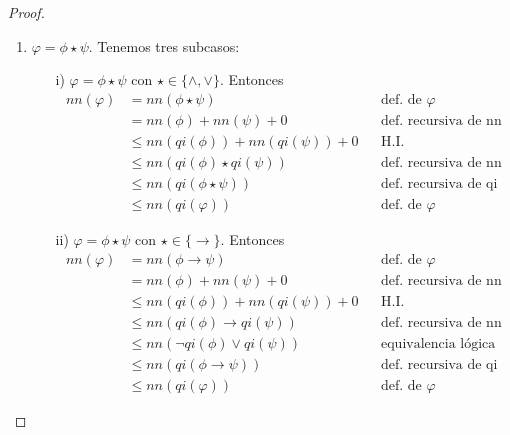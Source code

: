 \documentclass[letterpaper,12pt]{article}
\begin{document}
\begin{enumerate}
\begin{enumerate}
\begin{proof}
\begin{itemize}
\begin{enumerate}
                    \item $\varphi = \phi \star \psi$. Tenemos tres subcasos:
                    \begin{itemize}
                        \item[i)] $\varphi = \phi \star \psi$ con 
                        $\star \in \{\land, \lor \}$. Entonces 
                        \begin{align*}
                            nn(\varphi) 
                            &= nn(\phi \star \psi)
                            && \text{def. de $\varphi$} \\
                            &= nn(\phi) + nn(\psi) + 0
                            && \text{def. recursiva de nn} \\
                            &\leq nn(qi(\phi)) + nn(qi(\psi)) + 0
                            && \text{H.I.} \\
                            &\leq nn(qi(\phi) \star qi(\psi))
                            && \text{def. recursiva de nn} \\
                            &\leq nn(qi(\phi \star \psi))
                            && \text{def. recursiva de qi} \\
                            &\leq nn(qi(\varphi)) 
                            && \text{def. de $\varphi$}
                        \end{align*}

                        \item[ii)] $\varphi = \phi \star \psi$ con 
                        $\star \in \{ \rightarrow\}$. Entonces 
                        \begin{align*}
                            nn(\varphi) 
                            &= nn(\phi \rightarrow \psi)
                            && \text{def. de $\varphi$} \\
                            &= nn(\phi) + nn(\psi) + 0
                            && \text{def. recursiva de nn} \\
                            &\leq nn(qi(\phi)) + nn(qi(\psi)) + 0
                            && \text{H.I.} \\
                            &\leq nn(qi(\phi) \rightarrow qi(\psi))
                            && \text{def. recursiva de nn} \\
                            &\leq nn(\neg qi(\phi) \lor qi(\psi))
                            && \text{equivalencia lógica} \\
                            &\leq nn(qi(\phi \rightarrow \psi))
                            && \text{def. recursiva de qi} \\
                            &\leq nn(qi(\varphi))
                            && \text{def. de $\varphi$}
                        \end{align*}


\end{itemize}
\end{enumerate}
\end{itemize}
\end{proof}
\end{enumerate}
\end{enumerate}
\end{document}
